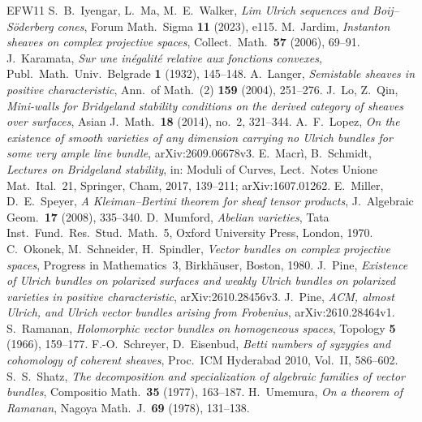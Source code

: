 \documentclass[11pt]{amsart}
\theoremstyle{definition}
\theoremstyle{remark}
\begin{document}
\begin{thebibliography}{EFW11}
 S.~B.~Iyengar, L.~Ma, M.~E.~Walker, \emph{Lim Ulrich sequences and Boij--Söderberg cones}, Forum Math.\ Sigma \textbf{11} (2023), e115.
 M.~Jardim, \emph{Instanton sheaves on complex projective spaces}, Collect.\ Math.\ \textbf{57} (2006), 69--91.
 J.~Karamata, \emph{Sur une inégalité relative aux fonctions convexes}, Publ.\ Math.\ Univ.\ Belgrade \textbf{1} (1932), 145--148.
 A.~Langer, \emph{Semistable sheaves in positive characteristic}, Ann.\ of Math.\ (2) \textbf{159} (2004), 251--276.
 J.~Lo, Z.~Qin, \emph{Mini-walls for Bridgeland stability conditions on the derived category of sheaves over surfaces}, Asian J.\ Math.\ \textbf{18} (2014), no.~2, 321--344.
 A.~F.~Lopez, \emph{On the existence of smooth varieties of any dimension carrying no Ulrich bundles for some very ample line bundle}, arXiv:2609.06678v3.
 E.~Macrì, B.~Schmidt, \emph{Lectures on Bridgeland stability}, in: Moduli of Curves, Lect.\ Notes Unione Mat.\ Ital.~21, Springer, Cham, 2017, 139--211; arXiv:1607.01262.
 E.~Miller, D.~E.~Speyer, \emph{A Kleiman--Bertini theorem for sheaf tensor products}, J.\ Algebraic Geom.\ \textbf{17} (2008), 335--340.
 D.~Mumford, \emph{Abelian varieties}, Tata Inst.\ Fund.\ Res.\ Stud.\ Math.~5, Oxford University Press, London, 1970.
 C.~Okonek, M.~Schneider, H.~Spindler, \emph{Vector bundles on complex projective spaces}, Progress in Mathematics~3, Birkhäuser, Boston, 1980.
 J.~Pine, \emph{Existence of Ulrich bundles on polarized surfaces and weakly Ulrich bundles on polarized varieties in positive characteristic}, arXiv:2610.28456v3.
 J.~Pine, \emph{ACM, almost Ulrich, and Ulrich vector bundles arising from Frobenius}, arXiv:2610.28464v1.
 S.~Ramanan, \emph{Holomorphic vector bundles on homogeneous spaces}, Topology \textbf{5} (1966), 159--177.
 F.-O.~Schreyer, D.~Eisenbud, \emph{Betti numbers of syzygies and cohomology of coherent sheaves}, Proc.\ ICM Hyderabad 2010, Vol.~II, 586--602.
 S.~S.~Shatz, \emph{The decomposition and specialization of algebraic families of vector bundles}, Compositio Math.\ \textbf{35} (1977), 163--187.
 H.~Umemura, \emph{On a theorem of Ramanan}, Nagoya Math.\ J.\ \textbf{69} (1978), 131--138.
\end{thebibliography}
\end{document}
